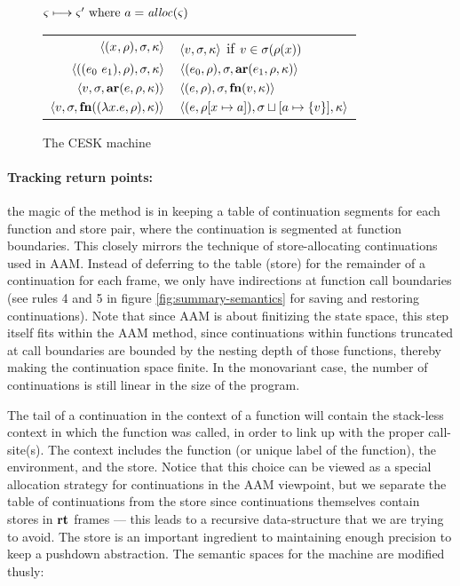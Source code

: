 \documentclass{llncs}
\begin{document}
\begin{figure}
  \centering
  $\varsigma \longmapsto \varsigma' \text{ where } a = \mathit{alloc}(\varsigma)$ \\
  \begin{tabular}{r|l}
    \hline
    $\langle (x^{{}}, \rho), \sigma, \kappa \rangle$
    &
    $\langle v,\sigma,\kappa \rangle$ if $v \in \sigma(\rho(x))$
    \\
    $\langle ((e_{0}\ e_{1}){}, \rho), \sigma, \kappa \rangle$
    &
    $\langle (e_{0}, \rho), \sigma, \mathbf{ar}{}(e_{1},\rho,\kappa) \rangle$
    \\
    $\langle v, \sigma, \mathbf{ar}{}(e,\rho,\kappa) \rangle$
    &
    $\langle (e, \rho), \sigma, \mathbf{fn}{}(v, \kappa) \rangle$
    \\
    $\langle v,\sigma,\mathbf{fn}{}((\lambda{} x. e, \rho), \kappa) \rangle$
    &
    $\langle (e, \rho[x \mapsto a]), \sigma\sqcup[a \mapsto \{ v \}], \kappa \rangle$
  \end{tabular}
  \caption{The CESK machine}
  \label{fig:base-semantics}
\end{figure}

\paragraph{Tracking return points:} the magic of the method is in
keeping a table of continuation segments for each function and store
pair, where the continuation is segmented at function boundaries. This
closely mirrors the technique of store-allocating continuations used
in AAM. Instead of deferring to the table (store) for the remainder of
a continuation for each frame, we only have indirections at function
call boundaries (see rules 4 and 5 in figure
\ref{fig:summary-semantics} for saving and restoring
continuations). Note that since AAM is about finitizing the state
space, this step itself fits within the AAM method, since
continuations within functions truncated at call boundaries are
bounded by the nesting depth of those functions, thereby making the
continuation space finite. In the monovariant case, the number of
continuations is still linear in the size of the program.

The tail of a continuation in the context of a function will contain
the stack-less context in which the function was called, in order to
link up with the proper call-site(s). The context includes the
function (or unique label of the function), the environment, and the
store. Notice that this choice can be viewed as a special allocation
strategy for continuations in the AAM viewpoint, but we separate the
table of continuations from the store since continuations themselves
contain stores in $\mathbf{rt}$ frames --- this leads to a recursive
data-structure that we are trying to avoid. The store is an important
ingredient to maintaining enough precision to keep a pushdown
abstraction. The semantic spaces for the machine are modified thusly:
\end{document}
